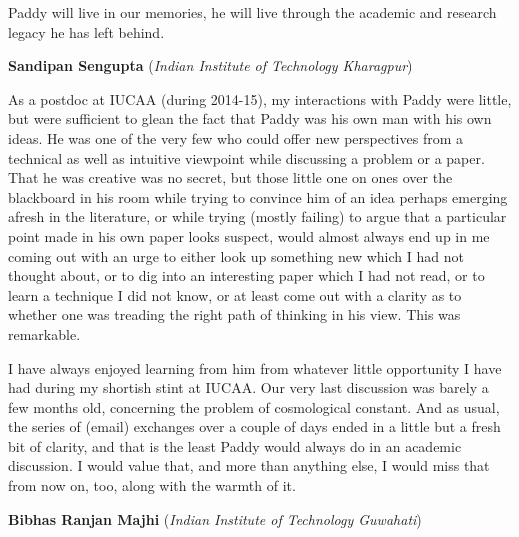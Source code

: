 \documentclass[prd, preprint, longbibliography, 11pt]{revtex4-1}
\begin{document}
Paddy will live in our memories, he will live through the  academic and research legacy he has left behind.


\bigskip
\bigskip
\centerline{{\bf Sandipan Sengupta} ({\it Indian Institute of Technology Kharagpur})}
\medskip
{}

\noindent As a postdoc at IUCAA (during 2014-15), my interactions with Paddy were little, but were
sufficient to glean the fact that Paddy was his own man with his own ideas. He was one of the very
few who could offer new perspectives from a technical as well as intuitive viewpoint while
discussing a problem or a paper. That he was creative was no secret, but those little one on ones
over the blackboard in his room while trying to convince him of an idea perhaps emerging afresh in
the literature, or while trying (mostly failing) to argue that a particular point made in his own paper
looks suspect, would almost always end up in me coming out with an urge to either look up
something new which I had not thought about, or to dig into an interesting paper which I had not
read, or to learn a technique I did not know, or at least come out with a clarity as to whether one was
treading the right path of thinking in his view. This was remarkable.

I have always enjoyed learning from him from whatever little opportunity I have had during my
shortish stint at IUCAA. Our very last discussion was barely a few months old, concerning the
problem of cosmological constant. And as usual, the series of (email) exchanges over a couple of
days ended in a little but a fresh bit of clarity, and that is the least Paddy would always do in an
academic discussion. I would value that, and more than anything else, I would miss that from now
on, too, along with the warmth of it.





\bigskip
\bigskip

\centerline{{\bf Bibhas Ranjan Majhi} ({\it Indian Institute of Technology Guwahati})}
\medskip
{}
\end{document}
